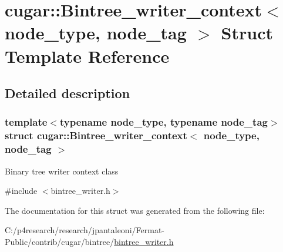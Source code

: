 \hypertarget{structcugar_1_1_bintree__writer__context}{}\section{cugar\+:\+:Bintree\+\_\+writer\+\_\+context$<$ node\+\_\+type, node\+\_\+tag $>$ Struct Template Reference}
\label{structcugar_1_1_bintree__writer__context}


\subsection{Detailed description}
\subsubsection*{template$<$typename node\+\_\+type, typename node\+\_\+tag$>$\newline
struct cugar\+::\+Bintree\+\_\+writer\+\_\+context$<$ node\+\_\+type, node\+\_\+tag $>$}

Binary tree writer context class 

{\ttfamily \#include $<$bintree\+\_\+writer.\+h$>$}



The documentation for this struct was generated from the following file\+:\begin{DoxyCompactItemize}
\item 
C\+:/p4research/research/jpantaleoni/\+Fermat-\/\+Public/contrib/cugar/bintree/\hyperlink{bintree__writer_8h}{bintree\+\_\+writer.\+h}\end{DoxyCompactItemize}
